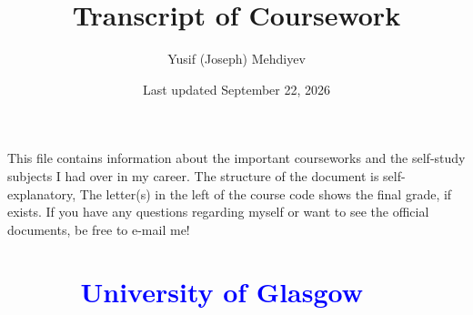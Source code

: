 \documentclass[12pt]{article}
\title{Transcript of Coursework}
\author{Yusif (Joseph) Mehdiyev}
\date{Last updated September 22, 2026}
\begin{document}
\maketitle

This file contains information  about the important courseworks and the self-study subjects  I had over in my career. The structure of the document is self-explanatory, The letter(s) in the left of the course code shows the final grade, if exists. If you have any questions regarding myself or want to see the official documents, be free to e-mail me!
\renewcommand{\contentsname}{Contents:} %
\tableofcontents
{}
\section*{\textcolor{blue}{\ \ \ \ \  University of Glasgow}}
\end{document}

